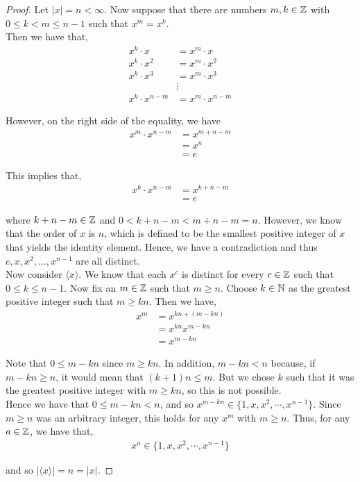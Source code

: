 \documentclass[11pt, reqno]{amsart}
\theoremstyle{plain}
\theoremstyle{definition}
\theoremstyle{example}
\begin{document}
\begin{proof}
Let $|x| = n < \infty$. Now suppose that there are numbers $m, k \in \mathbb{Z}$ with $0 \leq k < m \leq n-1$ such that $x^m = x^k$.\\

Then we have that,
\begin{align*}
x^k \cdot x &= x^m \cdot x\\
x^k \cdot x^2 &= x^m \cdot x^2\\
x^k \cdot x^3 &= x^m \cdot x^3\\
&\vdots\\
x^k \cdot x^{n-m} &= x^m \cdot x^{n-m}
\end{align*}

However, on the right side of the equality, we have
\begin{align*}
x^m \cdot x^{n-m} &= x^{m+n-m}\\
&= x^n\\
&= e
\end{align*}

This implies that,
\begin{align*}
x^k \cdot x^{n-m} &= x^{k+n-m}\\
&= e
\end{align*}

where $k+n-m \in \mathbb{Z}$ and $0 < k+n-m < m+n-m = n$. However, we know that the order of $x$ is $n$, which is defined to be the smallest positive integer of $x$ that yields the identity element. Hence, we have a contradiction and thus $e, x, x^2, \dots, x^{n-1}$ are all distinct.\\

Now consider $\langle x \rangle$. We know that each $x^c$ is distinct for every $c \in \mathbb{Z}$ such that $0 \leq k \leq n-1$. Now fix an $m \in \mathbb{Z}$ such that $m \geq n$. Choose $k \in \mathbb{N}$ as the greatest positive integer such that $m \geq kn$. Then we have,
\begin{align*}
x^m &= x^{kn + (m - kn)}\\
&= x^{kn}x^{m - kn}\\
&= x^{m-kn}
\end{align*}

Note that $0 \leq m - kn$ since $m \geq kn$. In addition, $m - kn < n$ because, if $m - kn \geq n$, it would mean that $(k+1)n \leq m$. But we chose $k$ such that it was the greatest positive integer with $m \geq kn$, so this is not possible.\\

Hence we have that $0 \leq m - kn < n$, and so $x^{m - kn} \in \{1, x, x^2, \cdots, x^{n-1}\}$. Since $m \geq n$ was an arbitrary integer, this holds for any $x^m$ with $m \geq n$. Thus, for any $a \in \mathbb{Z}$, we have that,
\begin{align*}
x^a \in \{1, x, x^2, \cdots, x^{n-1}\}
\end{align*} 

and so $| \langle x \rangle | = n = |x|$.
\end{proof}
\end{document}
